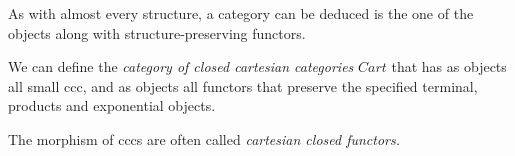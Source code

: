 As with almost every structure, a category can be deduced is the one of the objects along with structure-preserving functors.

\begin{definition}
  We can define the \emph{category of closed cartesian categories} $Cart$ that has as objects all small ccc, and as objects all functors that preserve the specified terminal, products and exponential objects.
\end{definition}

The morphism of cccs are often called \emph{cartesian closed functors.}

